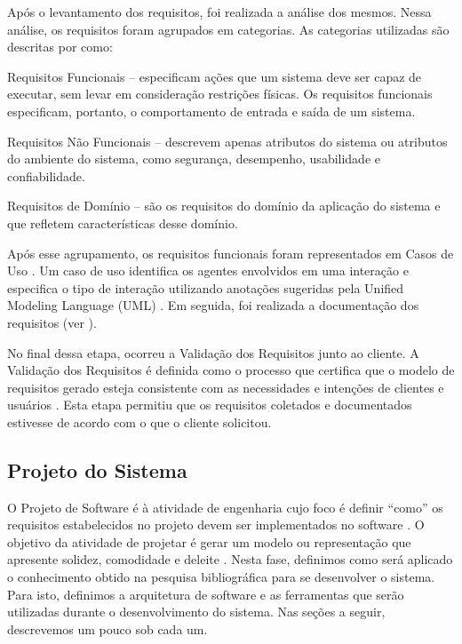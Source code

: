 Após o levantamento dos requisitos, foi realizada a análise dos mesmos. Nessa análise, os requisitos foram agrupados em categorias. As categorias utilizadas são descritas por 
 como:
\begin{alineascomponto}
    \item Requisitos Funcionais -- especificam ações que um sistema deve ser
capaz de executar, sem levar em consideração restrições físicas. Os requisitos
funcionais especificam, portanto, o comportamento de entrada e saída de um
sistema.
    \item Requisitos Não Funcionais -- descrevem apenas atributos do sistema ou
atributos do ambiente do sistema, como segurança, desempenho, usabilidade e
confiabilidade.
    \item Requisitos de Domínio -- são os requisitos do domínio da aplicação do sistema e que refletem características desse domínio.
\end{alineascomponto}

Após esse agrupamento, os requisitos funcionais foram representados em Casos de Uso \cite{jacobson92engenharia}. Um caso de uso identifica os agentes envolvidos em uma interação e especifica o tipo 
de interação utilizando anotações sugeridas pela Unified Modeling Language (UML) 
. Em seguida, foi realizada a documentação dos requisitos (ver ).

No final dessa etapa, ocorreu a Validação dos Requisitos junto ao cliente.  A Validação dos Requisitos é definida como o processo que certifica que o modelo de requisitos gerado  esteja  consistente  
com  as  necessidades  e  intenções  de  clientes  e usuários \cite{rilston2003metodologia}. Esta etapa permitiu que os requisitos coletados e documentados estivesse de acordo com o que o 
cliente solicitou.

\subsection{Projeto do Sistema}

O Projeto de Software é à atividade de engenharia cujo foco é definir ``como'' os requisitos estabelecidos no projeto devem ser implementados no software \cite{pressman2006engenharia}. O objetivo da  
atividade de projetar é gerar um modelo ou representação que apresente solidez, comodidade e deleite \cite{pressman2006engenharia}. Nesta fase, definimos como será aplicado o conhecimento obtido na 
pesquisa bibliográfica para se desenvolver o sistema. Para isto, definimos a arquitetura de software e as ferramentas que serão utilizadas durante o desenvolvimento do sistema. Nas seções a seguir, 
descrevemos um pouco sob cada um.

